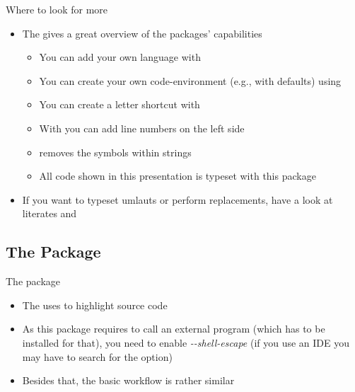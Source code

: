\begin{frame}{Where to look for more}
   \begin{itemize}
      \itemsep8pt
      \item The  gives a great overview of the packages' capabilities \begin{itemize}
         \item You can add your own language with 
         \item You can create your own code-environment (e.g., with defaults) using 
         \item You can create a letter shortcut with 
         \item With  you can add line numbers on the left side
         \item {} removes the \say{\T{\textvisiblespace}} symbols within strings
         \item All code shown in this presentation is typeset with this package
      \end{itemize}
      \item If you want to typeset umlauts or perform replacements, have a look at literates and 
   \end{itemize}
\end{frame}


\subsection[The minted Package]{The \Minted Package}


\begin{frame}{The \Minted package}
   \begin{itemize}
      \item The \Minted uses  to highlight source code
      \item As this package requires to call an external program (which has to be installed for that), you need to enable \textit{-\kern0pt-shell-escape} (if you use an IDE you may have to search for the option)
      \item Besides that, the basic workflow is rather similar
   \end{itemize}
\end{frame}

